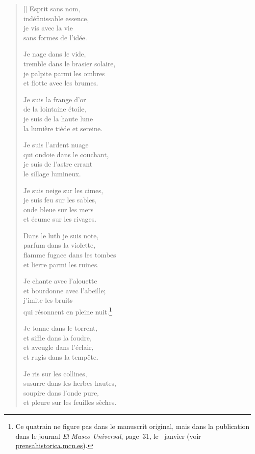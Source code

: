\documentclass[a4paper,12pt]{book}
\begin{document}
\begin{verse}[\versewidth]
  Esprit sans nom, \\
  indéfinissable essence, \\
  je vis avec la vie \\
  sans formes de l'idée.

  Je nage dans le vide, \\
  tremble dans le brasier solaire, \\
  je palpite parmi les ombres \\
  et flotte avec les brumes.

  Je suis la frange d'or \\
  de la lointaine étoile, \\
  je suis de la haute lune \\
  la lumière tiède et sereine.

  Je suis l'ardent nuage \\
  qui ondoie dans le couchant, \\
  je suis de l'astre errant \\
  le sillage lumineux.

  Je suis neige sur les cimes, \\
  je suis feu sur les sables, \\
  onde bleue sur les mers \\
  et écume sur les rivages.

  Dans le luth je suis note, \\
  parfum dans la violette, \\
  flamme fugace dans les tombes \\
  et lierre parmi les ruines.

  Je chante avec l'alouette \\
  et bourdonne avec l'abeille; \\
  j'imite les bruits \\
  qui résonnent en pleine nuit.\footnote{Ce quatrain ne
figure pas dans le manuscrit original, mais dans la publication dans
le journal \emph{El Museo Universal}, page~31, le~
janvier  (voir \url{prensahistorica.mcu.es}).}

  Je tonne dans le torrent, \\
  et siffle dans la foudre, \\
  et aveugle dans l'éclair, \\
  et rugis dans la tempête.

  Je ris sur les collines, \\
  susurre dans les herbes hautes, \\
  soupire dans l'onde pure, \\
  et pleure sur les feuilles sèches.


\end{verse}
\end{document}
